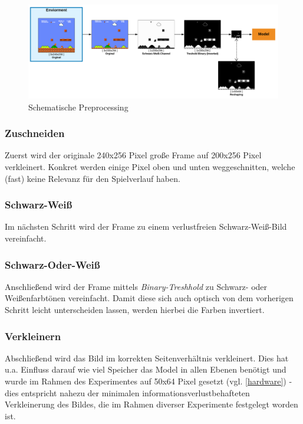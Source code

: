 \documentclass[sigconf,nonacm]{acmart}
\begin{document}
\begin{figure}[hbt!]
\includegraphics[angle=90,scale=0.08]{preprocessing.png}
\caption{Schematische Preprocessing}
\end{figure}

\subsubsection{Zuschneiden}\hfill \break
Zuerst wird der originale 240x256 Pixel große Frame auf 200x256 Pixel verkleinert. Konkret werden einige Pixel oben und unten weggeschnitten, welche (fast) keine Relevanz für den Spielverlauf haben.

\subsubsection{Schwarz-Weiß}\hfill \break
Im nächsten Schritt wird der Frame zu einem verlustfreien Schwarz-Weiß-Bild vereinfacht.

\subsubsection{Schwarz-Oder-Weiß}\hfill \break
Anschließend wird der Frame mittels \textit{Binary-Treshhold} zu Schwarz- oder Weißenfarbtönen vereinfacht. Damit diese sich auch optisch von dem vorherigen Schritt leicht unterscheiden lassen, werden hierbei die Farben invertiert.

\subsubsection{Verkleinern}\hfill \break
Abschließend wird das Bild im korrekten Seitenverhältnis verkleinert. Dies hat u.a. Einfluss darauf wie viel Speicher das Model in allen Ebenen benötigt und wurde im Rahmen des Experimentes auf 50x64 Pixel gesetzt (vgl. \ref{hardware}) - dies entspricht nahezu der minimalen informationsverlustbehafteten Verkleinerung des Bildes, die im Rahmen diverser Experimente festgelegt worden ist.
\end{document}
